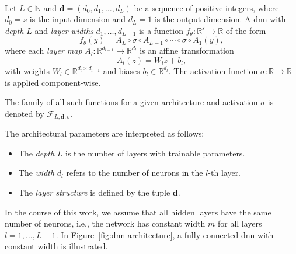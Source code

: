 \begin{definition} \ \\
Let $L \in \mathbb{N}$ and $\mathbf{d} = (d_0, d_1, \dots, d_L)$ be a sequence
of positive integers, where $d_0 = s$ is the input dimension and $d_L = 1$ is
the output dimension. A \acf{dnn} with \emph{depth} $L$ and \emph{layer widths}
$d_1, \dots, d_{L-1}$ is a function $f_\theta: \mathbb{R}^s
\to \mathbb{R}$ of the form
\begin{equation*}
    f_\theta(y) = A_L \circ \sigma \circ A_{L-1} \circ \cdots \circ \sigma \circ A_1(y),
\end{equation*}
where each \emph{layer map} $A_l: \mathbb{R}^{d_{l-1}} \to \mathbb{R}^{d_l}$ is
an affine transformation
\begin{equation*}
    A_l(z) = W_l z + b_l,
\end{equation*}
with weights $W_l \in \mathbb{R}^{d_l \times d_{l-1}}$ and biases $b_l \in
\mathbb{R}^{d_l}$. The activation function $\sigma: \mathbb{R} \to \mathbb{R}$
is applied component-wise.

The family of all such functions for a given architecture and activation
$\sigma$ is denoted by $\mathcal{F}_{L, \mathbf{d}, \sigma}$.

\vspace{0.5em}
\noindent The architectural parameters are interpreted as follows:
\begin{itemize}
    \item The \emph{depth} $L$ is the number of layers with trainable
    parameters.
    \item The \emph{width} $d_l$ refers to the number of neurons in the $l$-th
    layer.
    \item The \emph{layer structure} is defined by the tuple $\mathbf{d}$.
\end{itemize}
\end{definition}

In the course of this work, we assume that all hidden layers have the same
number of neurons, i.e., the network has constant width $m$ for all layers $l =
1, \dots, L-1$. In Figure~\ref{fig:dnn-architecture}, a fully connected \ac{dnn} with constant width is illustrated.

